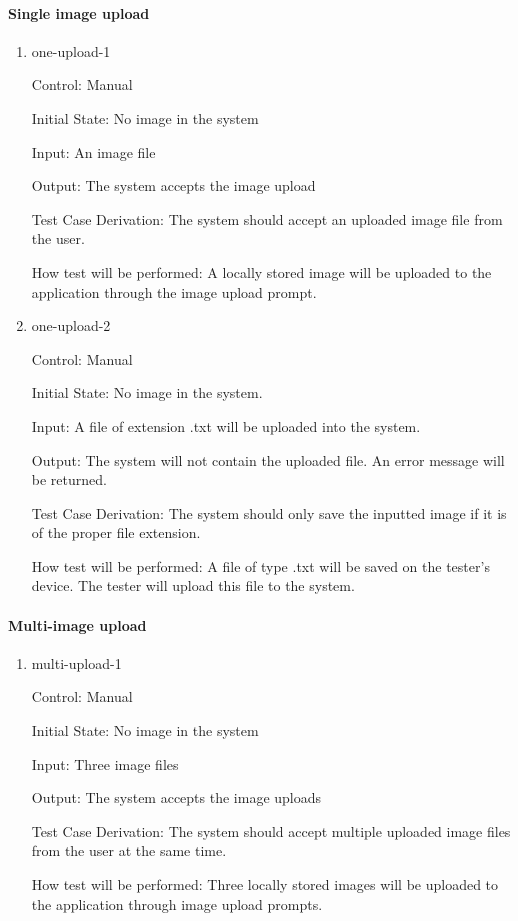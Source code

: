 \documentclass[12pt, titlepage]{article}
\begin{document}
	\paragraph{Single image upload}
	
	\begin{enumerate}
		
		\item{one-upload-1\\}
		
		Control: Manual
		
		Initial State: No image in the system
		
		Input: An image file
		
		Output: The system accepts the image upload
		
		Test Case Derivation: The system should accept an uploaded image file from the user.
		
		How test will be performed: A locally stored image will be uploaded to 
		the application through the image upload prompt.
		
		\item{one-upload-2\\}
		
		Control: Manual
		
		Initial State: No image in the system.
		
		Input: A file of extension .txt will be uploaded into the system.
		
		Output: The system will not contain the uploaded file. An error message 
		will be returned.
		
		Test Case Derivation: The system should only save the inputted image if 
		it is of the proper file extension.
		
		How test will be performed: A file of type .txt will be saved on the 
		tester's device. The tester will upload this file to the system.
		
	\end{enumerate}
	
	\paragraph{Multi-image upload}
	
	\begin{enumerate}
		
		\item{multi-upload-1\\}
		
		Control: Manual
		
		Initial State: No image in the system
		
		Input: Three image files
		
		Output: The system accepts the image uploads
		
		Test Case Derivation: The system should accept multiple uploaded image files from the user at the same time.
		
		How test will be performed: Three locally stored images will be uploaded to the application through image upload prompts. 
		
	\end{enumerate}
	
\end{document}
